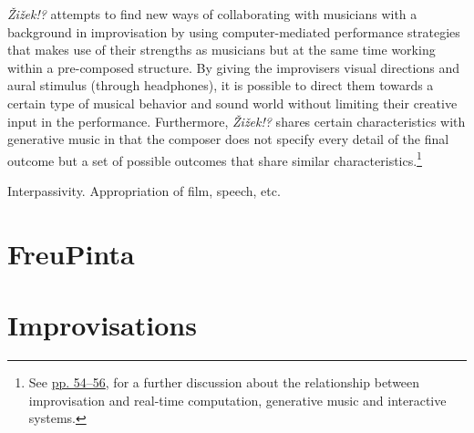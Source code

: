 \emph{\v{Z}i\v{z}ek!?} attempts to find new ways of collaborating with musicians with a background in improvisation by using computer-mediated performance strategies that makes use of their strengths as musicians but at the same time working within a pre-composed structure. By giving the improvisers visual directions and aural stimulus (through headphones), it is possible to direct them towards a certain type of musical behavior and sound world without limiting their creative input in the performance. Furthermore, \emph{\v{Z}i\v{z}ek!?} shares certain characteristics with generative music in that the composer does not specify every detail of the final outcome but a set of possible outcomes that share similar characteristics.\footnote{See \hyperlink{realtimepos}{pp. 54--56}, for a further discussion about the relationship between improvisation and real-time computation, generative music and interactive systems.}

Interpassivity. Appropriation of film, speech, etc.

\section{FreuPinta}


\section{Improvisations}


\label{ch:compositions}